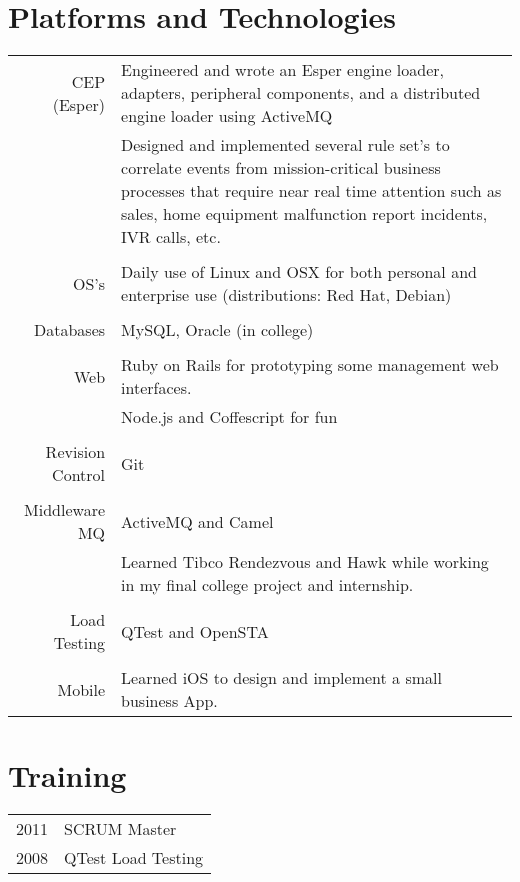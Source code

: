 \documentclass[a4paper,10pt]{article}
\begin{document}
\section{Platforms and Technologies}
\begin{tabular}{r|p{11cm}}
	CEP (Esper) 
	& Engineered and wrote an Esper engine loader, adapters, peripheral components, and a distributed engine loader using ActiveMQ\\
	& Designed and implemented several rule set's to correlate events from mission-critical business processes that require near real time attention such as sales, home equipment malfunction report incidents, IVR calls, etc.\\
\multicolumn{2}{c}{} \\ 
	OS's 
	&  Daily use of Linux and OSX for both personal and enterprise use (distributions: Red Hat, Debian) \\
\multicolumn{2}{c}{} \\
	Databases 
	& MySQL, Oracle (in college)\\
\multicolumn{2}{c}{} \\
	Web 
	& Ruby on Rails for prototyping some management web interfaces. \\
	& Node.js and Coffescript for fun \\
\multicolumn{2}{c}{} \\
	Revision Control 
	& Git \\
\multicolumn{2}{c}{} \\
	Middleware \ MQ 
	& ActiveMQ and Camel \\
	& Learned Tibco Rendezvous and Hawk while working in my final college project and internship. \\
\multicolumn{2}{c}{} \\
	Load Testing 
	& QTest and OpenSTA \\
\multicolumn{2}{c}{} \\
	Mobile 
	& Learned iOS to design and implement a small business App. \\
\end{tabular}

\section{Training}
\begin{tabular}{rl}
 2011 & SCRUM Master  \\
 2008 & QTest Load Testing \\
\end{tabular}
\end{document}
